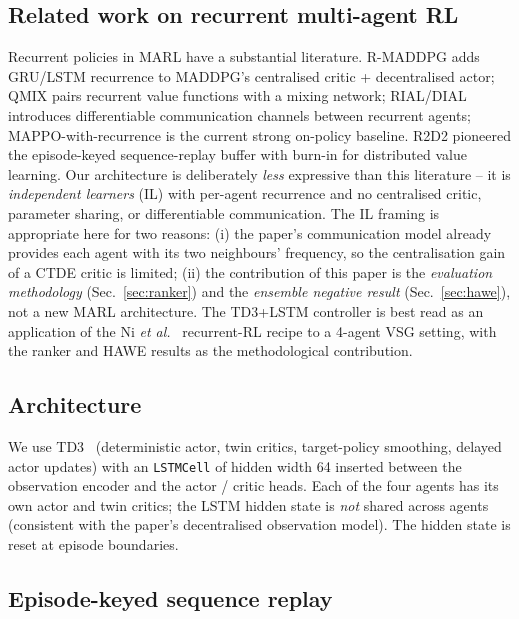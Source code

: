 \documentclass[journal,onecolumn,11pt]{IEEEtran}
\begin{document}
\subsection{Related work on recurrent multi-agent RL}

Recurrent policies in MARL have a substantial literature. R-MADDPG
\cite{wang2020rmaddpg} adds GRU/LSTM recurrence to MADDPG's
centralised critic + decentralised actor; QMIX
\cite{rashid2018qmix} pairs recurrent value functions with a mixing
network; RIAL/DIAL \cite{foerster2016rialdial} introduces
differentiable communication channels between recurrent agents;
MAPPO-with-recurrence \cite{yu2022mappo} is the current strong
on-policy baseline. R2D2 \cite{kapturowski2019r2d2} pioneered the
episode-keyed sequence-replay buffer with burn-in for distributed
value learning. Our architecture is deliberately
\emph{less} expressive than this literature -- it is
\emph{independent learners} (IL) with per-agent recurrence and
no centralised critic, parameter sharing, or differentiable
communication. The IL framing is appropriate here for two reasons:
(i) the paper's communication model already provides each agent
with its two neighbours' frequency, so the centralisation gain of
a CTDE critic is limited; (ii) the contribution of this paper is
the \emph{evaluation methodology} (Sec.~\ref{sec:ranker}) and the
\emph{ensemble negative result} (Sec.~\ref{sec:hawe}), not a new
MARL architecture. The TD3+LSTM controller is best read as an
application of the Ni \emph{et al.}\ \cite{ni2022recurrent}
recurrent-RL recipe to a 4-agent VSG setting, with the
ranker and HAWE results as the methodological contribution.

\subsection{Architecture}

We use TD3~\cite{fujimoto2018td3} (deterministic actor, twin
critics, target-policy smoothing, delayed actor updates) with an
\texttt{LSTMCell} of hidden width 64 inserted between the
observation encoder and the actor / critic heads. Each of the four
agents has its own actor and twin critics; the LSTM hidden state is
\emph{not} shared across agents (consistent with the paper's
decentralised observation model). The hidden state is reset at
episode boundaries.

\subsection{Episode-keyed sequence replay}
\end{document}
